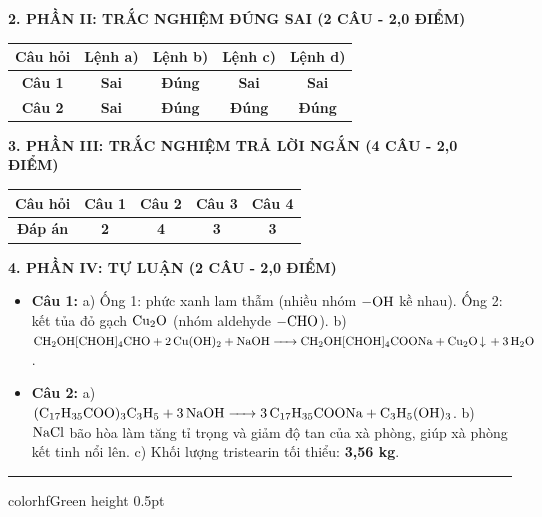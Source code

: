 \documentclass[11pt,a4paper]{article}
\begin{document}
\vspace{2pt}
\noindent
\textbf{\color{mainGreen}2. PHẦN II: TRẮC NGHIỆM ĐÚNG SAI (2 CÂU - 2,0 ĐIỂM)}
\begin{center}
\renewcommand{\arraystretch}{1.2}
\begin{tabular}{|c|c|c|c|c|}
\hline
\rowcolor{tableGreen}
\textbf{Câu hỏi} & \textbf{Lệnh a)} & \textbf{Lệnh b)} & \textbf{Lệnh c)} & \textbf{Lệnh d)} \\
\hline
\textbf{Câu 1} & \textbf{Sai} & \textbf{\color{hfRed}Đúng} & \textbf{Sai} & \textbf{Sai} \\
\hline
\textbf{Câu 2} & \textbf{Sai} & \textbf{\color{hfRed}Đúng} & \textbf{\color{hfRed}Đúng} & \textbf{\color{hfRed}Đúng} \\
\hline
\end{tabular}
\end{center}

\vspace{2pt}
\noindent
\textbf{\color{mainGreen}3. PHẦN III: TRẮC NGHIỆM TRẢ LỜI NGẮN (4 CÂU - 2,0 ĐIỂM)}
\begin{center}
\renewcommand{\arraystretch}{1.2}
\begin{tabular}{|c|c|c|c|c|}
\hline
\rowcolor{tableGreen}
\textbf{Câu hỏi} & \textbf{Câu 1} & \textbf{Câu 2} & \textbf{Câu 3} & \textbf{Câu 4} \\
\hline
\textbf{Đáp án} & \textbf{\color{hfRed}2} & \textbf{\color{hfRed}4} & \textbf{\color{hfRed}3} & \textbf{\color{hfRed}3} \\
\hline
\end{tabular}
\end{center}

\vspace{2pt}
\noindent
\textbf{\color{mainGreen}4. PHẦN IV: TỰ LUẬN (2 CÂU - 2,0 ĐIỂM)}
\begin{itemize}[leftmargin=*,itemsep=1pt]
\item \textbf{Câu 1:} a) Ống 1: phức xanh lam thẫm (nhiều nhóm $\ce{-OH}$ kề nhau). Ống 2: kết tủa đỏ gạch $\ce{Cu2O}$ (nhóm aldehyde $\ce{-CHO}$). b) $\ce{CH2OH[CHOH]4CHO + 2Cu(OH)2 + NaOH -> CH2OH[CHOH]4COONa + Cu2O v + 3H2O}$.
\item \textbf{Câu 2:} a) $\ce{(C17H35COO)3C3H5 + 3NaOH -> 3C17H35COONa + C3H5(OH)3}$. b) $\ce{NaCl}$ bão hòa làm tăng tỉ trọng và giảm độ tan của xà phòng, giúp xà phòng kết tinh nổi lên. c) Khối lượng tristearin tối thiểu: \textbf{\color{hfRed}3,56 kg}.
\end{itemize}

\vspace{4pt}
\hrule color{hfGreen} height 0.5pt
\end{document}
